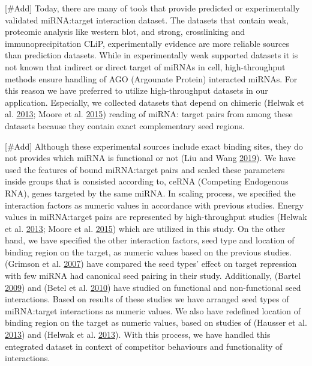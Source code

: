 \documentclass[a4,center,fleqn]{NAR}
\begin{document}
{[}\#Add{]} Today, there are many of tools that provide predicted or
experimentally validated miRNA:target interaction dataset. The datasets
that contain weak, proteomic analysis like western blot, and strong,
crosslinking and immunoprecipitation CLiP, experimentally evidence are
more reliable sources than prediction datasets. While in experimentally
weak supported datasets it is not known that indirect or direct target
of miRNAs in cell, high-throughput methods ensure handling of AGO
(Argounate Protein) interacted miRNAs. For this reason we have preferred
to utilize high-throughput datasets in our application. Especially, we
collected datasets that depend on chimeric (Helwak et al.
\protect\hyperlink{ref-helwak_mapping_2013}{2013}; Moore et al.
\protect\hyperlink{ref-moore_mirnatarget_2015}{2015}) reading of miRNA:
target pairs from among these datasets because they contain exact
complementary seed regions.

{[}\#Add{]} Although these experimental sources include exact binding
sites, they do not provides which miRNA is functional or not (Liu and
Wang \protect\hyperlink{ref-liu2019prediction}{2019}). We have used the
features of bound miRNA:target pairs and scaled these parameters inside
groups that is consisted according to, ceRNA (Competing Endogenous RNA),
genes targeted by the same miRNA. In scaling process, we specified the
interaction factors as numeric values in accordance with previous
studies. Energy values in miRNA:target pairs are represented by
high-throughput studies (Helwak et al.
\protect\hyperlink{ref-helwak_mapping_2013}{2013}; Moore et al.
\protect\hyperlink{ref-moore_mirnatarget_2015}{2015}) which are utilized
in this study. On the other hand, we have specified the other
interaction factors, seed type and location of binding region on the
target, as numeric values based on the previous studies.(Grimson et al.
\protect\hyperlink{ref-grimson_microrna_2007}{2007}) have compared the
seed types' effect on target repression with few miRNA had canonical
seed pairing in their study. Additionally, (Bartel
\protect\hyperlink{ref-bartel_micrornas:_2009}{2009}) and (Betel et al.
\protect\hyperlink{ref-betel2010comprehensive}{2010}) have studied on
functional and non-functional seed interactions. Based on results of
these studies we have arranged seed types of miRNA:target interactions
as numeric values. We also have redefined location of binding region on
the target as numeric values, based on studies of (Hausser et al.
\protect\hyperlink{ref-hausser_analysis_2013}{2013}) and (Helwak et al.
\protect\hyperlink{ref-helwak_mapping_2013}{2013}). With this process,
we have handled this entegrated dataset in context of competitor
behaviours and functionality of interactions.
\end{document}
